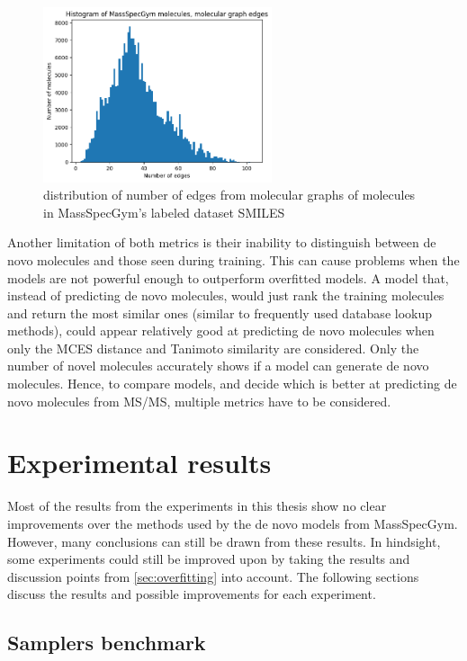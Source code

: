 \begin{figure}[H]
    \centering
    \includegraphics[width=0.6\textwidth]{figures/discussion/number_of_edges_massspecgym.png}
    \caption{distribution of number of edges from molecular graphs of molecules in MassSpecGym's labeled dataset SMILES}
    \label{fig:edges}
\end{figure}


Another limitation of both metrics is their inability to distinguish between de novo molecules and those seen during training.
This can cause problems when the models are not powerful enough to outperform overfitted models.
A model that, instead of predicting de novo molecules, would just rank the training molecules and return the most similar ones (similar to frequently used database lookup methods), could appear relatively good at predicting de novo molecules when only the \ac{MCES} distance and Tanimoto similarity are considered.
Only the number of novel molecules accurately shows if a model can generate de novo molecules.
Hence, to compare models, and decide which is better at predicting de novo molecules from \ac{MS/MS}, multiple metrics have to be considered.

\section{Experimental results}

Most of the results from the experiments in this thesis show no clear improvements over the methods used by the de novo models from MassSpecGym.
However, many conclusions can still be drawn from these results.
In hindsight, some experiments could still be improved upon by taking the results and discussion points from \ref{sec:overfitting} into account.
The following sections discuss the results and possible improvements for each experiment.

\subsection{Samplers benchmark}

